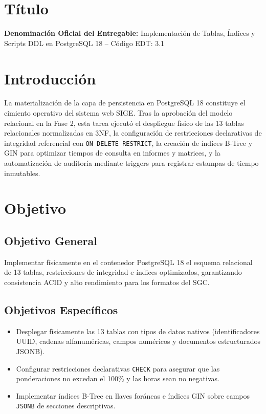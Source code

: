 \documentclass[12pt,a4paper]{article}
\begin{document}
\section{Título}
\textbf{Denominación Oficial del Entregable:} Implementación de Tablas, Índices y Scripts DDL en PostgreSQL 18 -- Código EDT: 3.1

\section{Introducción}
La materialización de la capa de persistencia en PostgreSQL 18 constituye el cimiento operativo del sistema web SIGE. Tras la aprobación del modelo relacional en la Fase 2, esta tarea ejecutó el despliegue físico de las 13 tablas relacionales normalizadas en 3NF, la configuración de restricciones declarativas de integridad referencial con \texttt{ON DELETE RESTRICT}, la creación de índices B-Tree y GIN para optimizar tiempos de consulta en informes y matrices, y la automatización de auditoría mediante triggers para registrar estampas de tiempo inmutables.

\section{Objetivo}
\subsection{Objetivo General}
Implementar físicamente en el contenedor PostgreSQL 18 el esquema relacional de 13 tablas, restricciones de integridad e índices optimizados, garantizando consistencia ACID y alto rendimiento para los formatos del SGC.
\subsection{Objetivos Específicos}
\begin{itemize}[leftmargin=1.5em, itemsep=2pt]
    \item Desplegar físicamente las 13 tablas con tipos de datos nativos (identificadores UUID, cadenas alfanuméricas, campos numéricos y documentos estructurados JSONB).
    \item Configurar restricciones declarativas \texttt{CHECK} para asegurar que las ponderaciones no excedan el 100\% y las horas sean no negativas.
    \item Implementar índices B-Tree en llaves foráneas e índices GIN sobre campos \texttt{JSONB} de secciones descriptivas.
\end{itemize}
\end{document}
